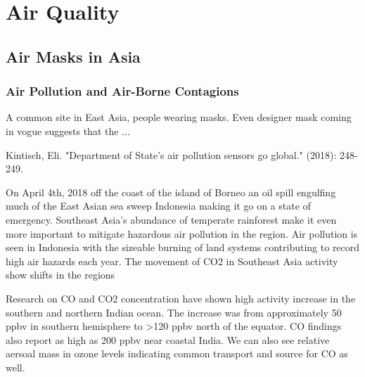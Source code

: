 \chapter{Air Quality}\label{ch:air_quality}

\section{Air Masks in Asia}

\subsection{Air Pollution and Air-Borne Contagions}

A common site in East Asia, people wearing masks. Even designer mask coming in vogue suggests that the ...


Kintisch, Eli. "Department of State's air pollution sensors go global." (2018): 248-249.


On April 4th, 2018 off the coast of the island of Borneo an oil spill engulfing much of the East Asian sea sweep Indonesia making it go on a state of emergency. Southeast Asia's abundance of temperate rainforest make it even more important to mitigate hazardous air pollution in the region. Air pollution is seen in Indonesia with the sizeable burning of land systems contributing to record high air hazards each year. The movement of CO2 in Southeast Asia activity show shifts in the regions 

Research on CO and CO2 concentration have shown high activity increase in the southern and northern Indian ocean. The increase was from approximately 50 ppbv in southern hemisphere to >120 ppbv north of the equator. CO findings also report as high as 200 ppbv near coastal India. We can also see relative aersoal mass in ozone levels indicating common transport and source for CO as well. \citep{phadnis2002evolution}